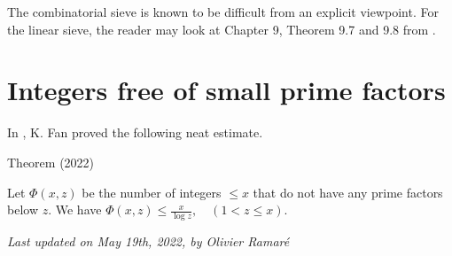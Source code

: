 The combinatorial sieve is known to be difficult from an explicit
viewpoint. For the linear sieve, the reader may look at Chapter 9,
Theorem 9.7 and 9.8 from
\cite{Nathanson*96-2}.


\section{Integers free of small prime factors}


In
\cite{Fan*22}, K. Fan proved
the following neat estimate.
\par 
\begin{thm}{Theorem (2022)}

Let $\Phi(x,z)$ be the number of integers $\le x$ that do not have any
prime factors below $z$. We have
$\displaystyle
\Phi(x,z)\le \frac{x}{\log z},
\quad(1 < z\le x).
$
\end{thm}







  
\begin{flushright}\small\sl{}   Last updated on May 19th, 2022, by Olivier Ramar\'e
 \end{flushright}














